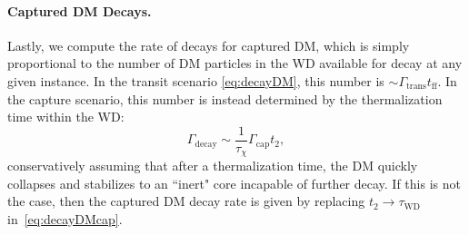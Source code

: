 \paragraph{Captured DM Decays.}
Lastly, we compute the rate of decays for captured DM, which is simply proportional to the number of DM particles in the WD available for decay at any given instance.
In the transit scenario \eqref{eq:decayDM}, this number is $\sim \Gamma_\text{trans} t_\text{ff}$.
In the capture scenario, this number is instead determined by the thermalization time within the WD:
\begin{equation}
\Gamma_\text{decay} \sim  \frac{1}{\tau_\chi} \Gamma_\text{cap} t_2,
\label{eq:decayDMcap}
\end{equation}
conservatively assuming that after a thermalization time, the DM quickly collapses and stabilizes to an ``inert" core incapable of further decay.
If this is not the case, then the captured DM decay rate is given by replacing $t_2 \to \tau_\text{WD}$ in~\eqref{eq:decayDMcap}.
